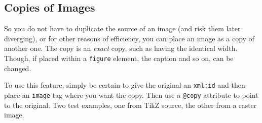 \documentclass[10pt,]{article}
\theoremstyle{plain}
\theoremstyle{definition}
\theoremstyle{definition}
\theoremstyle{definition}
\theoremstyle{definition}
\theoremstyle{definition}
\theoremstyle{definition}
\numberwithin{equation}{section}
\begin{document}
\subsection[{Copies of Images}]{Copies of Images}\label{subsection-24}
\hypertarget{p-270}{}%
So you do not have to duplicate the source of an image (and risk them later diverging), or for other reasons of efficiency, you can place an image as a copy of another one.  The copy is an \emph{exact} copy, such as having the identical width.  Though, if placed within a \lstinline?figure? element, the caption and so on, can be changed.%
\par
\hypertarget{p-271}{}%
To use this feature, simply be certain to give the original an \lstinline?xml:id? and then place an \lstinline?image? tag where you want the copy.  Then use a \lstinline?@copy? attribute to point to the original.  Two test examples, one from TikZ source, the other from a raster image.%
\end{document}
